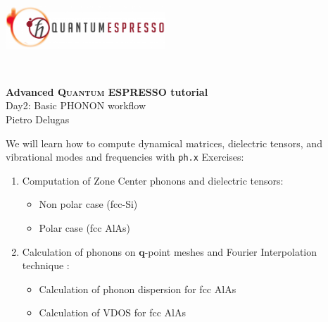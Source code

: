 \documentclass[landscape]{foils}
\begin{document}
\blue
\vspace*{0.75cm}
\begin{center}
\includegraphics[width=0.45\textwidth]{../pictures/quantum_ogo_ok-1536x412.png}
\end{center}
~\\
\vspace{0.80em}
\begin{center}
	\textbf{\burgundy \LARGE Advanced  {\scshape Quantum ESPRESSO} tutorial}\\[2em]
  {\burgundy\LARGE Day2: Basic PHONON  workflow}
  ~\\[1.3em]  
  \large Pietro Delugas
\end{center}


We will learn how to compute dynamical matrices, dielectric tensors, and vibrational modes and frequencies with \texttt{ph.x} 
Exercises: 
\begin{enumerate}
\item Computation of Zone Center phonons and dielectric tensors:
	\begin{itemize} 
		\item{Non polar case (fcc-Si) }
		\item{Polar case (fcc AlAs) }
	\end{itemize}
\item Calculation of phonons on $\mathbf{q}$-point meshes and Fourier Interpolation technique :
	\begin{itemize}
	   \item{Calculation of phonon dispersion for fcc AlAs} 
           \item{Calculation of VDOS for fcc AlAs} 
	\end{itemize}
\end{enumerate}
    
\end{document}
